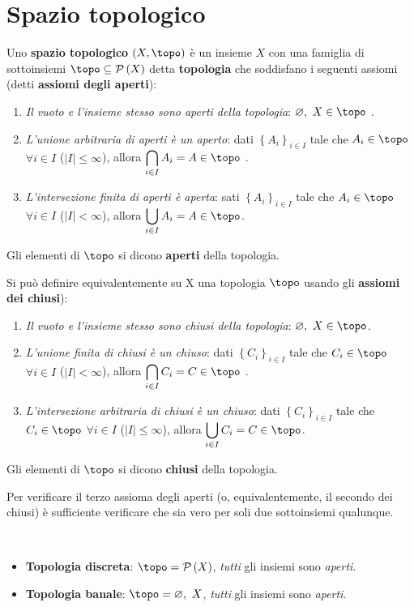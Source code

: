\section{Spazio topologico}
\begin{define}
Uno \textbf{spazio topologico} $\left(X, \topo\right)$ è un insieme $X$ con una famiglia di sottoinsiemi $\topo\subseteq\setpart{X}$ detta \textbf{topologia} che soddisfano i seguenti assiomi (detti \textbf{assiomi degli aperti}):
\begin{enumerate}
\item \textit{Il vuoto e l'insieme stesso sono aperti della topologia}: $\emptyset,\ X\in\topo$ .
\item \textit{L'unione arbitraria di aperti è un aperto}: dati $\left\{A_i\right\}_{i\in I}$ tale che $A_i\in\topo$ $\forall i\in I$ ($|I|\leq \infty$), allora $\displaystyle\union_{i\in I}A_i=A\in\topo$ .
\item \textit{L'intersezione finita di aperti è aperta}: sati $\left\{A_i\right\}_{i\in I}$ tale che $A_i\in\topo$ $\forall i\in I$ ($|I|< \infty$), allora $\displaystyle\inter_{i\in I}A_i=A\in\topo$.
\end{enumerate}
Gli elementi di $\topo$ si dicono \textbf{aperti} della topologia.
\end{define}
\begin{define} Si può definire equivalentemente su X una topologia $\topo$ usando gli \textbf{assiomi dei chiusi}):
\begin{enumerate}
	\item \textit{Il vuoto e l'insieme stesso sono chiusi della topologia}: $\emptyset,\ X\in\topo$.
	\item \textit{L'unione finita di chiusi è un chiuso}: dati $\left\{C_i\right\}_{i\in I}$ tale che $C_i\in\topo$ $\forall i\in I$ ($|I|< \infty$), allora $\displaystyle\union_{i\in I}C_i=C\in\topo$ .
	\item \textit{L'intersezione arbitraria di chiusi è un chiuso}: dati $\left\{C_i\right\}_{i\in I}$ tale che $C_i\in\topo$ $\forall i\in I$ ($|I|\leq \infty$), allora $\displaystyle\inter_{i\in I}C_i=C\in\topo$.
\end{enumerate}
Gli elementi di $\topo$ si dicono \textbf{chiusi} della topologia.
\end{define}
\begin{observe}
Per verificare il terzo assioma degli aperti (o, equivalentemente, il secondo dei chiusi) è sufficiente verificare che sia vero per soli due sottoinsiemi qualunque.
\end{observe}
\begin{example}~{}
\begin{itemize}
\item \textbf{Topologia discreta}: $\topo=\setpart{X}$, \textit{tutti} gli insiemi sono \textit{aperti}.
\item \textbf{Topologia banale}: $\topo={\emptyset,\ X}$, \textit{tutti} gli insiemi sono \textit{aperti}.
\end{itemize}
\end{example}
